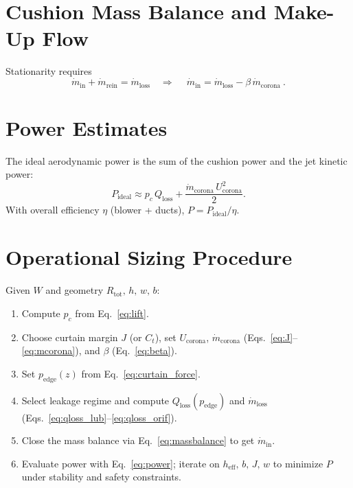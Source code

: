 \documentclass[11pt,a4paper]{article}
\begin{document}
\section{Cushion Mass Balance and Make-Up Flow}
Stationarity requires
\begin{equation}
  \dot m_{\mathrm{in}} + \dot m_{\mathrm{rein}} = \dot m_{\mathrm{loss}}
  \quad\Rightarrow\quad
  \boxed{\ \dot m_{\mathrm{in}} = \dot m_{\mathrm{loss}} - \beta\,\dot m_{\mathrm{corona}}\ }.
  \label{eq:massbalance}
\end{equation}

\section{Power Estimates}
The ideal aerodynamic power is the sum of the cushion power and the jet kinetic power:
\begin{equation}
  P_{\mathrm{ideal}} \approx p_c\,Q_{\mathrm{loss}} + \frac{\dot m_{\mathrm{corona}}\,U_{\mathrm{corona}}^{2}}{2}.
  \label{eq:power}
\end{equation}
With overall efficiency $\eta$ (blower + ducts), $P=P_{\mathrm{ideal}}/\eta$.

\section{Operational Sizing Procedure}
Given $W$ and geometry $R_{\text{tot}},\,h,\,w,\,b$:
\begin{enumerate}
  \item Compute $p_c$ from Eq.~\eqref{eq:lift}.
  \item Choose curtain margin $J$ (or $C_t$), set $U_{\mathrm{corona}}$, $\dot m_{\mathrm{corona}}$ (Eqs.~\eqref{eq:J}--\eqref{eq:mcorona}), and $\beta$ (Eq.~\eqref{eq:beta}).
  \item Set $p_\mathrm{edge}(z)$ from Eq.~\eqref{eq:curtain_force}.
  \item Select leakage regime and compute $Q_{\mathrm{loss}}(p_\mathrm{edge})$ and $\dot m_{\mathrm{loss}}$ (Eqs.~\eqref{eq:qloss_lub}--\eqref{eq:qloss_orif}).
  \item Close the mass balance via Eq.~\eqref{eq:massbalance} to get $\dot m_{\mathrm{in}}$.
  \item Evaluate power with Eq.~\eqref{eq:power}; iterate on $h_{\mathrm{eff}},\,b,\,J,\,w$ to minimize $P$ under stability and safety constraints.
\end{enumerate}
\end{document}

